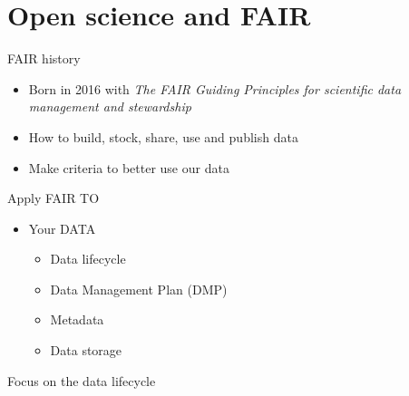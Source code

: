 \section{Open science and FAIR}

\begin{frame}
\begin{block}{FAIR history}
\begin{itemize}
\item Born in 2016 with \textit{The FAIR Guiding Principles for scientific data management and stewardship}
\item How to build, stock, share, use and publish data
\item Make criteria to better use our data
\end{itemize}
\end{block}
\end{frame}

\begin{frame}
\end{frame}

\begin{frame}
\begin{block}{Apply FAIR TO}
\begin{itemize}
\item Your DATA
	\begin{itemize}
	\item Data lifecycle
	\item Data Management Plan (DMP)
	\item Metadata
	\item Data storage
	\end{itemize}
\end{itemize}
\end{block}
\end{frame}

\begin{frame}{Focus on the data lifecycle}

\end{frame}

